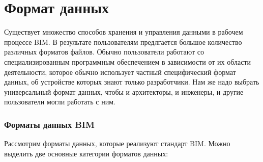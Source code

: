 \documentclass[a4paper,14pt]{extreport} %
\begin{document}
\newpage
\section{Формат данных}

Существует множество способов хранения и управления данными в рабочем процессе BIM. В результате пользователям предлгается большое количество различных форматов файлов.
Обычно пользователи работают со специализированным программным обеспечением в зависимости от их области деятельности, которое обычно использует частный специфический формат данных, об устройстве которых знают только разработчики. Нам же надо выбрать универсальный формат данных, чтобы и архитекторы, и инженеры, и другие пользователи могли работать с ним.

\subsubsection{Форматы данных BIM}
Рассмотрим форматы данных, которые реализуют стандарт BIM.
Можно выделить две основные категории форматов данных:
\end{document}
